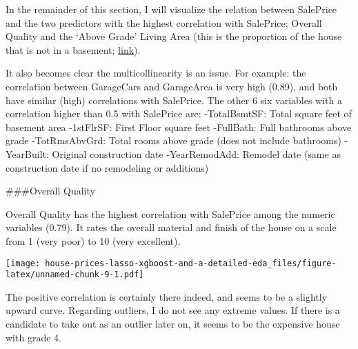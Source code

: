 \documentclass[]{article}
\newenvironment{Shaded}{\begin{snugshade}}{\end{snugshade}}
\newcommand{\DataTypeTok}[1]{\textcolor[rgb]{0.13,0.29,0.53}{#1}}
\newcommand{\DecValTok}[1]{\textcolor[rgb]{0.00,0.00,0.81}{#1}}
\newcommand{\KeywordTok}[1]{\textcolor[rgb]{0.13,0.29,0.53}{\textbf{#1}}}
\newcommand{\NormalTok}[1]{#1}
\newcommand{\OperatorTok}[1]{\textcolor[rgb]{0.81,0.36,0.00}{\textbf{#1}}}
\newcommand{\StringTok}[1]{\textcolor[rgb]{0.31,0.60,0.02}{#1}}
\begin{document}
In the remainder of this section, I will visualize the relation between
SalePrice and the two predictors with the highest correlation with
SalePrice; Overall Quality and the `Above Grade' Living Area (this is
the proportion of the house that is not in a basement;
\href{http://www.gimme-shelter.com/above-grade-50066/}{link}).

It also becomes clear the multicollinearity is an issue. For example:
the correlation between GarageCars and GarageArea is very high (0.89),
and both have similar (high) correlations with SalePrice. The other 6
six variables with a correlation higher than 0.5 with SalePrice are:
-TotalBsmtSF: Total square feet of basement area -1stFlrSF: First Floor
square feet -FullBath: Full bathrooms above grade -TotRmsAbvGrd: Total
rooms above grade (does not include bathrooms) -YearBuilt: Original
construction date -YearRemodAdd: Remodel date (same as construction date
if no remodeling or additions)

\#\#\#Overall Quality

Overall Quality has the highest correlation with SalePrice among the
numeric variables (0.79). It rates the overall material and finish of
the house on a scale from 1 (very poor) to 10 (very excellent).

\begin{Shaded}
\end{Shaded}

\texttt{[image: house-prices-lasso-xgboost-and-a-detailed-eda\_files/figure-latex/unnamed-chunk-9-1.pdf]}

The positive correlation is certainly there indeed, and seems to be a
slightly upward curve. Regarding outliers, I do not see any extreme
values. If there is a candidate to take out as an outlier later on, it
seems to be the expensive house with grade 4.
\end{document}
